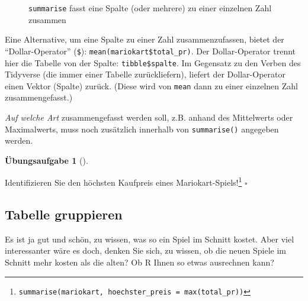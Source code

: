 \documentclass[
  letterpaper,
]{scrbook}
\theoremstyle{definition}
\newtheorem{exercise}{Übungsaufgabe}[chapter]
\theoremstyle{definition}
\theoremstyle{definition}
\theoremstyle{remark}
\begin{document}
\begin{figure}


\caption{\label{fig-desk-summ}\texttt{summarise} fasst eine Spalte (oder
mehrere) zu einer einzelnen Zahl zusammen}

\end{figure}%

Eine Alternative, um eine Spalte zu einer Zahl zusammenzufassen, bietet
der \enquote{Dollar-Operator} (\texttt{\$}):
\texttt{mean(mariokart\$total\_pr)}. Der Dollar-Operator trennt hier die
Tabelle von der Spalte: \texttt{tibble\$spalte}. Im Gegensatz zu den
Verben des Tidyverse (die immer einer Tabelle zurückliefern), liefert
der Dollar-Operator einen Vektor (Spalte) zurück. (Diese wird von
\texttt{mean} dann zu einer einzelnen Zahl zusammengefasst.)

\emph{Auf welche Art} zusammengefasst werden soll, z.B. anhand des
Mittelwerts oder Maximalwerts, muss noch zusätzlich innerhalb von
\texttt{summarise()} angegeben werden.

\begin{exercise}[]\protect\hypertarget{exr-summarise}{}\label{exr-summarise}

Identifizieren Sie den höchsten Kaufpreis eines
Mariokart-Spiels!\footnote{\texttt{summarise(mariokart,\ hoechster\_preis\ =\ max(total\_pr))}}
\(\square\)

\end{exercise}

\subsection{Tabelle gruppieren}\label{tabelle-gruppieren}

Es ist ja gut und schön, zu wissen, was so ein Spiel im Schnitt kostet.
Aber viel interessanter wäre es doch, denken Sie sich, zu wissen, ob die
neuen Spiele im Schnitt mehr kosten als die alten? Ob R Ihnen so etwas
ausrechnen kann?
\end{document}
